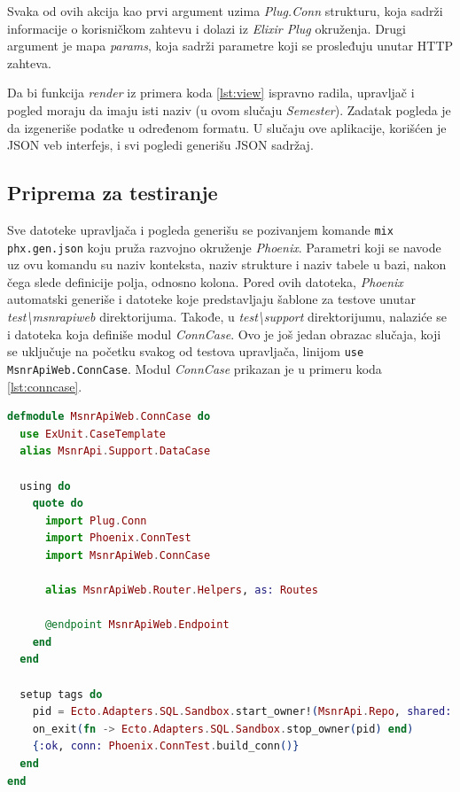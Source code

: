 \documentclass[12pt,oneside]{memoir}
\begin{document}
\par Svaka od ovih akcija kao prvi argument uzima \emph{Plug.Conn} strukturu, koja sadrži informacije o korisničkom zahtevu i dolazi iz \emph{Elixir Plug} okruženja. Drugi argument je mapa \emph{params}, koja sadrži parametre koji se prosleđuju unutar HTTP zahteva.
\par Da bi funkcija \emph{render} iz primera koda \ref{lst:view} ispravno radila, upravljač i pogled moraju da imaju isti naziv (u ovom slučaju \emph{Semester}). Zadatak pogleda je da izgeneriše podatke u određenom formatu. U slučaju ove aplikacije, korišćen je JSON veb interfejs, i svi pogledi generišu JSON sadržaj.

\subsection{Priprema za testiranje}

\par Sve datoteke upravljača i pogleda generišu se pozivanjem komande \texttt{mix phx.gen.json} koju pruža razvojno okruženje \emph{Phoenix}. Parametri koji se navode uz ovu komandu su naziv konteksta, naziv strukture i naziv tabele u bazi, nakon čega slede definicije polja, odnosno kolona. Pored ovih datoteka, \emph{Phoenix} automatski generiše i datoteke koje predstavljaju šablone za testove unutar \emph{test{\textbackslash}msnr{\textunderscore}api{\textunderscore}web} direktorijuma. Takođe, u \emph{test{\textbackslash}support} direktorijumu, nalaziće se i datoteka koja definiše modul \emph{ConnCase}. Ovo je još jedan obrazac slučaja, koji se uključuje na početku svakog od testova upravljača, linijom \texttt{use MsnrApiWeb.ConnCase}. Modul \emph{ConnCase} prikazan je u primeru koda \ref{lst:conncase}. \\

\begin{minipage}{\linewidth}
\begin{lstlisting}[language=elixir, basicstyle=\small, caption={Modul \emph{ConnCase}},captionpos=b, label={lst:conncase}]
defmodule MsnrApiWeb.ConnCase do
  use ExUnit.CaseTemplate
  alias MsnrApi.Support.DataCase

  using do
    quote do
      import Plug.Conn
      import Phoenix.ConnTest
      import MsnrApiWeb.ConnCase

      alias MsnrApiWeb.Router.Helpers, as: Routes

      @endpoint MsnrApiWeb.Endpoint
    end
  end

  setup tags do
    pid = Ecto.Adapters.SQL.Sandbox.start_owner!(MsnrApi.Repo, shared: not tags[:async])
    on_exit(fn -> Ecto.Adapters.SQL.Sandbox.stop_owner(pid) end)
    {:ok, conn: Phoenix.ConnTest.build_conn()}
  end
end
\end{lstlisting}
\end{minipage}
\end{document}
